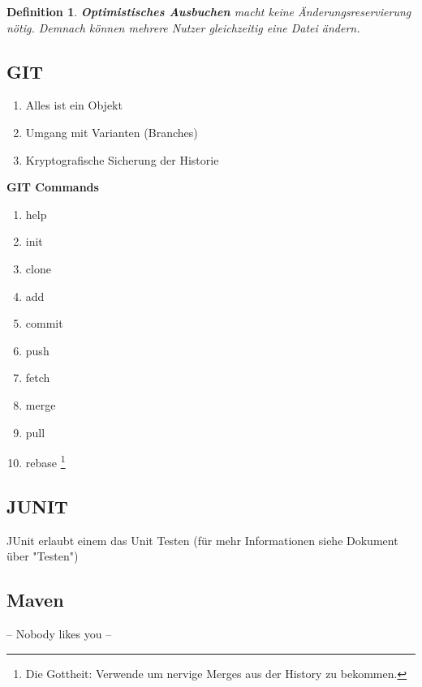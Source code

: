 \documentclass[a4paper]{article}
\theoremstyle{break}
\newtheorem{defi}{Definition}[section]
\begin{document}
    \begin {defi}
      \textbf{Optimistisches Ausbuchen} macht keine Änderungsreservierung nötig. Demnach können mehrere Nutzer gleichzeitig eine Datei ändern.
    \end {defi}

    \newpage
    \subsection{GIT}
    \begin{enumerate}
    \item Alles ist ein Objekt
    \item Umgang mit Varianten (Branches)
    \item Kryptografische Sicherung der Historie
    \end {enumerate}

    \begin{flushleft}
      \textbf{GIT Commands}
    \end{flushleft}
    \begin{enumerate}
    \item help
    \item init
    \item clone
    \item add
    \item commit
    \item push
    \item fetch
    \item merge
    \item pull
    \item rebase \footnote{Die Gottheit: Verwende um nervige Merges aus der History zu bekommen.}
    \end{enumerate}

    \subsection {JUNIT}
		JUnit erlaubt einem das Unit Testen (für mehr Informationen siehe Dokument über "Testen")
     \subsection {Maven} 
     -- Nobody likes you --



    
    
\end{document}
